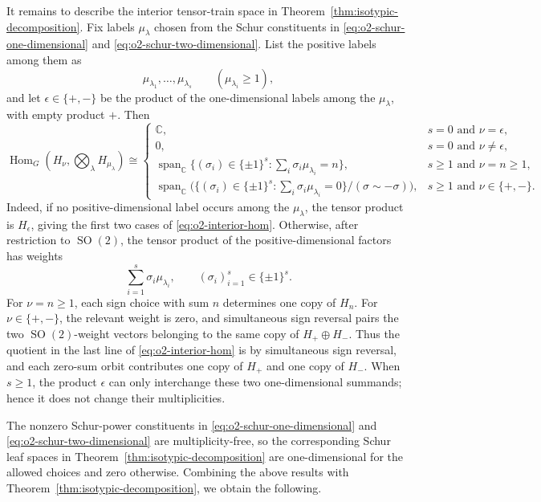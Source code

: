 \documentclass[11pt]{article}
\newcommand{\dsC}{\mathbb{C}}
\newcommand{\HomG}[2]{\operatorname{Hom}_G\!\left(#1,#2\right)}
\newcommand{\Span}{\operatorname{span}}
\newcommand{\SO}{\operatorname{SO}}
\theoremstyle{definition}
\begin{document}
It remains to describe the interior tensor-train space in Theorem~\ref{thm:isotypic-decomposition}.
Fix labels $\mu_\lambda$ chosen from the Schur constituents in \eqref{eq:o2-schur-one-dimensional} and \eqref{eq:o2-schur-two-dimensional}.
List the positive labels among them as
\[
  \mu_{\lambda_1},\dots,\mu_{\lambda_s}\qquad(\mu_{\lambda_i}\ge 1),
\]
and let $\epsilon\in\{+,-\}$ be the product of the one-dimensional labels among the $\mu_\lambda$, with empty product $+$.
Then
\begin{equation}\label{eq:o2-interior-hom}
  \HomG{H_\nu}{\bigotimes_\lambda H_{\mu_\lambda}}
  \cong
  \begin{cases}
    \dsC, & s=0\text{ and }\nu=\epsilon,\\
    0, & s=0\text{ and }\nu\neq\epsilon,\\
    \Span_{\dsC}\{(\sigma_i)\in\{\pm1\}^s:\sum_i\sigma_i \mu_{\lambda_i}=n\},
      & s\ge 1\text{ and }\nu=n\ge 1,\\
    \Span_{\dsC}\bigl(\{(\sigma_i)\in\{\pm1\}^s:\sum_i\sigma_i \mu_{\lambda_i}=0\}/(\sigma\sim-\sigma)\bigr),
      & s\ge 1\text{ and }\nu\in\{+,-\}.
  \end{cases}
\end{equation}
Indeed, if no positive-dimensional label occurs among the $\mu_\lambda$, the tensor product is $H_\epsilon$, giving the first two cases of \eqref{eq:o2-interior-hom}.
Otherwise, after restriction to $\SO(2)$, the tensor product of the positive-dimensional factors has weights
\[
  \sum_{i=1}^s \sigma_i \mu_{\lambda_i},
  \qquad
  (\sigma_i)_{i=1}^s\in\{\pm1\}^s.
\]
For $\nu=n\ge1$, each sign choice with sum $n$ determines one copy of $H_n$.
For $\nu\in\{+,-\}$, the relevant weight is zero, and simultaneous sign reversal pairs the two $\SO(2)$-weight vectors belonging to the same copy of $H_+\oplus H_-$.
Thus the quotient in the last line of \eqref{eq:o2-interior-hom} is by simultaneous sign reversal, and each zero-sum orbit contributes one copy of $H_+$ and one copy of $H_-$.
When $s\ge1$, the product $\epsilon$ can only interchange these two one-dimensional summands; hence it does not change their multiplicities.

The nonzero Schur-power constituents in \eqref{eq:o2-schur-one-dimensional} and \eqref{eq:o2-schur-two-dimensional} are multiplicity-free, so the corresponding Schur leaf spaces in Theorem~\ref{thm:isotypic-decomposition} are one-dimensional for the allowed choices and zero otherwise.
Combining the above results with Theorem~\ref{thm:isotypic-decomposition}, we obtain the following.
\end{document}
